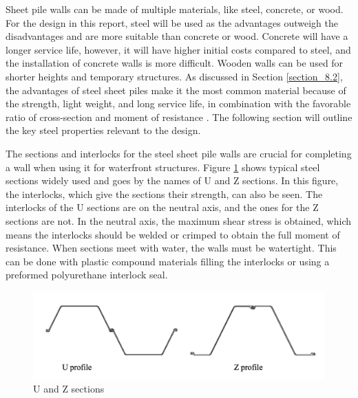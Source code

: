 

Sheet pile walls can be made of multiple materials, like steel, concrete, or wood. For the design in this report, steel will be used as the advantages outweigh the disadvantages and are more suitable than concrete or wood. Concrete will have a longer service life, however, it will have higher initial costs compared to steel, and the installation of concrete walls is more difficult. Wooden walls can be used for shorter heights and temporary structures.  As discussed in Section \ref{section_8.2}, the advantages of steel sheet piles make it the most common material because of the strength, light weight, and long service life, in combination with the favorable ratio of cross-section and moment of resistance \autocite{brownDesignSheetPile1994}. The following section will outline the key steel properties relevant to the design.


The sections and interlocks for the steel sheet pile walls are crucial for completing a wall when  using it for waterfront structures. Figure \ref{fig:sections_sheetpiles} shows typical steel sections widely used and goes by the names of U and Z sections. In this figure, the interlocks, which give the sections their strength, can also be seen. The interlocks of the U sections are on the neutral axis, and the ones for the Z sections are not. In the neutral axis, the maximum shear stress is obtained, which means the interlocks should be welded or crimped to obtain the full moment of resistance. When sections meet with water, the walls must be watertight. This can be done with plastic compound materials filling the interlocks or using a preformed polyurethane interlock seal. 


\begin{figure}[H]
    \centering
    \includegraphics[width=0.50\linewidth]{figures/ch8/u_profile_z_profile.png}
    \caption{U and Z sections}
    \label{fig:sections_sheetpiles}
\end{figure}

